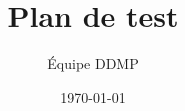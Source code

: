 \documentclass[a4paper,11pt,titlepage]{report}
\title{Plan de test}
\author{Équipe DDMP}
\date{\today}
\begin{document}


%

\renewcommand{\contentsname}{Sommaire}
\tableofcontents %
\listoftables %
















\end{document}
